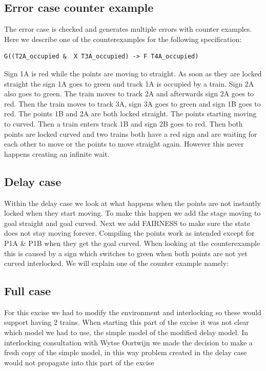 \documentclass[a4paper]{article}
\begin{document}
	\subsection{Error case counter example}
	The error case is checked and generates multiple errors with counter examples. Here we describe one of the counterexamples for the following specification: 
	\begin{lstlisting}
G((T2A_occupied &  X T3A_occupied) -> F T4A_occupied)
	\end{lstlisting}
	Sign 1A is red while the points are moving to straight. As soon as they are locked straight the sign 1A goes to green and track 1A is occupied by a train. Sign 2A also goes to green. The train moves to track 2A and afterwards sign 2A goes to red. Then the train moves to track 3A, sign 3A goes to green and sign 1B goes to red. The points 1B and 2A are both locked straight. The points starting moving to curved. Then a train enters track 1B and sign 2B goes to red. Then both points are locked curved and two trains both have a red sign and are waiting for each other to move or the points to move straight again. However this never happens creating an infinite wait.	
	
	\subsection{Delay case}
	Within the delay case we look at what happens when the points are not instantly locked when they start moving. To make this happen we add the stage moving to goal straight and goal curved.
	Next we add FAIRNESS to make sure the state does not stay moving forever.
	Compiling the points work as intended except for P1A \& P1B when they get the goal curved. When looking at the counterexample this is caused by a sign which switches to green when both points are not yet curved interlocked.
	We will explain one of the counter example namely:

	\subsection{Full case}
	For this excise we had to modify the environment and interlocking so these would support having 2 trains. When starting this part of the excise it was not clear which model we had to use, the simple model of the modified delay model. In interlocking consultation with Wytse Oortwijn we made the decision to make a fresh copy of the simple model, in this way problem created in the delay case would not propagate into this part of the excise 
	
\end{document}
